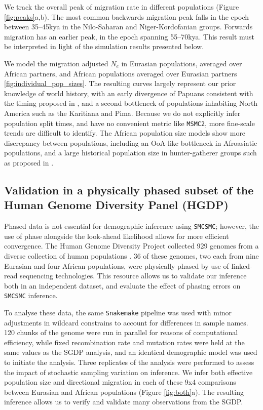 We track the overall peak of migration rate in different populations (Figure \ref{fig:peaks}a,b). The most common backwards migration peak falls in the epoch between 35--45kya in the Nilo-Saharan and Niger-Kordofanian groups. Forwards migration has an earlier peak, in the epoch spanning 55--70kya. This result must be interpreted in light of the simulation results presented below.  

We model the migration adjusted $N_e$ in Eurasian populations, averaged over African partners, and African populations averaged over Eurasian partners \ref{fig:individual_pop_sizes}. The resulting curves largely represent our prior knowledge of world history, with an early divergence of Papuans consistent with the timing proposed in \cite{Malaspinas2016}, and a second bottleneck of populations inhabiting North America such as the Karitiana and Pima. Because we do not explicitly infer population split times, and have no convenient metric like {\tt MSMC2}, more fine-scale trends are difficult to identify. The African population size models show more discrepancy between populations, including an OoA-like bottleneck in Afroasiatic populations, and a large historical population size in hunter-gatherer groups such as proposed in \cite{Lipson2019}. 



\subsection{Validation in a physically phased subset of the Human Genome Diversity Panel (HGDP)} \label{hgdp_section}

Phased data is not essential for demographic inference using {\tt SMCSMC}; however, the use of phase alongside the look-ahead likelihood allows for more efficient convergence. The Human Genome Diversity Project collected 929 genomes from a diverse collection of human populations \cite{Bergstrom2019}. 36 of these genomes, two each from nine Eurasian and four African populations, were physically phased by use of linked-read sequencing technologies. This resource allows us to validate our inference both in an independent dataset, and evaluate the effect of phasing errors on {\tt SMCSMC} inference.   

To analyse these data, the same {\tt Snakemake} pipeline was used with minor adjustments in wildcard constrains to account for differences in sample names. 120 chunks of the genome were run in parallel for reasons of computational efficiency, while fixed recombination rate and mutation rates were held at the same values as the SGDP analysis, and an identical demographic model was used to initiate the analysis. Three replicates of the analysis were performed to assess the impact of stochastic sampling variation on inference. We infer both effective population size and directional migration in each of these 9x4 comparisons between Eurasian and African populations (Figure \ref{fig:both}a). The resulting inference allows us to verify and validate many observations from the SGDP.


